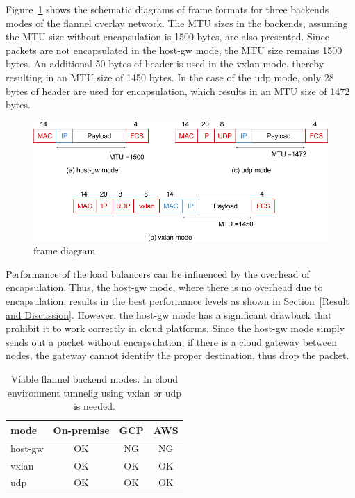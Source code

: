 Figure~\ref{fig:flannel-packet-diagram} shows the schematic diagrams of frame formats for three backends modes of the flannel overlay network. 
The MTU sizes in the backends, assuming the MTU size without encapsulation is 1500 bytes, are also presented.
Since packets are not encapsulated in the host-gw mode, the MTU size remains 1500 bytes.
An additional 50 bytes of header is used in the vxlan mode, thereby resulting in an MTU size of 1450 bytes.
In the case of the udp mode, only 28 bytes of header are used for encapsulation, which results in an MTU size of 1472 bytes.

\begin{figure}
  \centering
  \includegraphics[width=0.8\columnwidth]{Figs/flannel-packet-diagram}
  \caption{frame diagram}
  \label{fig:flannel-packet-diagram}
\end{figure}

Performance of the load balancers can be influenced by the overhead of encapsulation. 
Thus, the host-gw mode, where there is no overhead due to encapsulation, 
results in the best performance levels as shown in Section~\ref{Result and Discussion}.
However, the host-gw mode has a significant drawback that prohibit it to work correctly in cloud platforms. 
Since the host-gw mode simply sends out a packet without encapsulation, if there is a cloud gateway between nodes, 
the gateway cannot identify the proper destination, thus drop the packet.

\begin{table}
  \centering
  \begin{tabular}{lccc}
    \toprule
    mode & On-premise & GCP & AWS \\
    \midrule
    host-gw & OK & NG & NG \\
    vxlan & OK & OK & OK \\
    udp & OK & OK & OK \\
    \bottomrule
\end{tabular}

  \caption{Viable flannel backend modes. In cloud environment tunnelig using vxlan or udp is needed.}
  \label{tab:Viable flannel backends}
\end{table}

